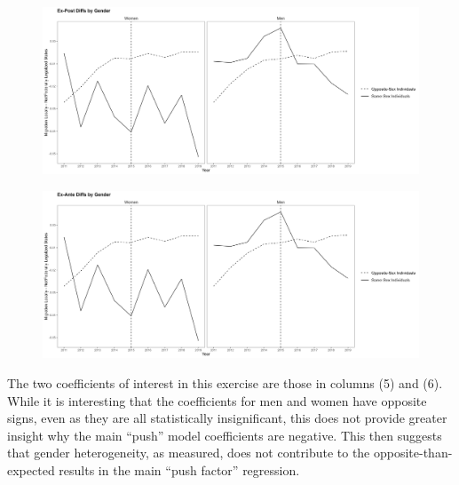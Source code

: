 \documentclass[12pt,letterpaper]{article}
\begin{document}
\begin{centering}
\begin{figure}
    \includegraphics[width=1\linewidth]{outputs/summary_stats/sex_post_diffs.png}
    \caption{}
    \label{fig: sex_post_diffs}
\end{figure}

\begin{figure}
    \includegraphics[width=1\linewidth]{outputs/summary_stats/sex_ante_diffs.png}
    \caption{}
    \label{fig: sex_ante_diffs}
\end{figure}
\end{centering}

The two coefficients of interest in this exercise are those in columns (5) and (6). While it is interesting that the coefficients for men and women have opposite signs, even as they are all statistically insignificant, this does not provide greater insight why the main “push” model coefficients are negative. This then suggests that gender heterogeneity, as measured, does not contribute to the opposite-than-expected results in the main “push factor” regression.


\begin{scriptsize}
\begin{table}[h]
    \centering
    
    \caption{}
    \label{tab: sex_expost_model}
\end{table}
\begin{table}[h]
    \centering
    
    \caption{}
    \label{tab: sex_exante_model}
\end{table}
\end{scriptsize}
\end{document}
